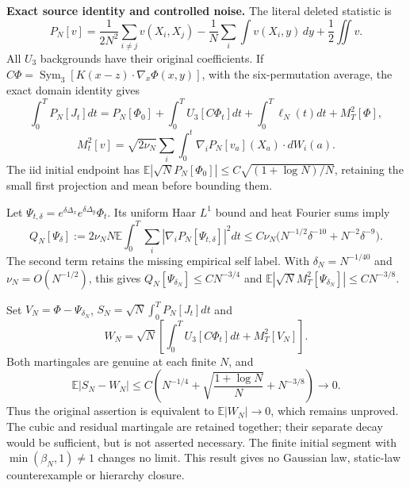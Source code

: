 \documentclass[11pt]{article}
\newcommand{\E}{\mathbb E}
\begin{document}
\noindent\textbf{Exact source identity and controlled noise.}
The literal deleted statistic is
\[
 P_N[v]=\frac1{2N^2}\sum_{i\ne j}v(X_i,X_j)-\frac1N\sum_i\int v(X_i,y)\,dy
 +\frac12\iint v.
\]
All $U_3$ backgrounds have their original coefficients. If $C\Phi=\operatorname{Sym}_3[K(x-z)\cdot\nabla_x\Phi(x,y)]$, with the six-permutation average, the exact domain identity gives
\[
 \int_0^T P_N[J_t]dt=P_N[\Phi_0]+\int_0^T U_3[C\Phi_t]dt
 +\int_0^T\ell_N(t)dt+M_T^2[\Phi],
\]
\[
 M_t^2[v]=\sqrt{2\nu_N}\sum_i\int_0^t\nabla_iP_N[v_a](X_a)\cdot dW_i(a).
\]
The iid initial endpoint has $\E|\sqrt N P_N[\Phi_0]|\le C\sqrt{(1+\log N)/N}$, retaining the small first projection and mean before bounding them.

Let $\Psi_{t,\delta}=e^{\delta\Delta_x}e^{\delta\Delta_y}\Phi_t$. Its uniform Haar $L^1$ bound and heat Fourier sums imply
\[
 Q_N[\Psi_\delta]:=2\nu_N N\E\int_0^T\sum_i|\nabla_iP_N[\Psi_{t,\delta}]|^2dt
 \le C\nu_N\bigl(N^{-1/2}\delta^{-10}+N^{-2}\delta^{-9}\bigr).
\]
The second term retains the missing empirical self label. With $\delta_N=N^{-1/40}$ and $\nu_N=O(N^{-1/2})$, this gives $Q_N[\Psi_{\delta_N}]\le C N^{-3/4}$ and $\E|\sqrt N M_T^2[\Psi_{\delta_N}]|\le C N^{-3/8}$.

Set $V_N=\Phi-\Psi_{\delta_N}$, $S_N=\sqrt N\int_0^T P_N[J_t]dt$ and
\[
 W_N=\sqrt N\left[\int_0^T U_3[C\Phi_t]dt+M_T^2[V_N]\right].
\]
Both martingales are genuine at each finite $N$, and
\[
 \E|S_N-W_N|\le C\left(N^{-1/4}+\sqrt{\frac{1+\log N}{N}}+N^{-3/8}\right)\longrightarrow0.
\]
Thus the original assertion is equivalent to $\E|W_N|\to0$, which remains unproved. The cubic and residual martingale are retained together; their separate decay would be sufficient, but is not asserted necessary. The finite initial segment with $\min(\beta_N,1)\ne1$ changes no limit. This result gives no Gaussian law, static-law counterexample or hierarchy closure.
\end{document}
